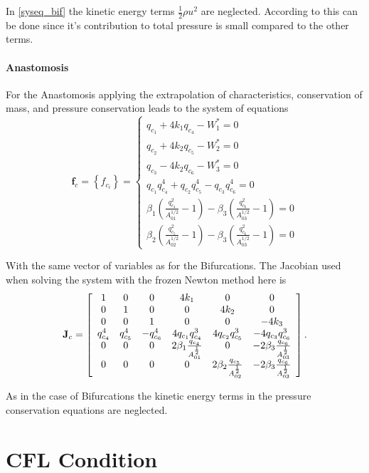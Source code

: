\documentclass[a4paper, oneside]{discothesis}
\begin{document}
In \ref{syseq_bif} the kinetic energy terms $\frac{1}{2} \rho u^2$ are neglected.
	According to \cite{Formaggia2003OnedimensionalMF} this can be done since it's contribution to total pressure is small compared to the other terms.
\paragraph{Anastomosis} \label{par:anastomosis}
For the Anastomosis applying the extrapolation of characteristics, conservation of mass, and pressure conservation leads to the system of equations
$$
\mathbf{f}_c=\left\{f_{c_i}\right\}=\left\{\begin{array}{l}
		q_{c_1}+4 k_1 q_{c_4}-W_1^*=0 \\
		q_{c_2}+4 k_2 q_{c_5}-W_2^*=0 \\
		q_{c_3}-4 k_2 q_{c_6}-W_3^*=0 \\
		q_{c_1} q_{c_4}^4+q_{c_2} q_{c_5}^4-q_{c_3} q_{c_6}^4=0 \\
		\beta_1\left(\frac{q_{c_4}^2}{A_{01}^{1 / 2}}-1\right)-\beta_3\left(\frac{q_{c_6}^2}{A_{03}^{1 / 2}}-1\right)=0 \\
		\beta_2\left(\frac{q_{c_5}^2}{A_{02}^{1 / 2}}-1\right)-\beta_3\left(\frac{q_{c_6}^2}{A_{03}^{1 / 2}}-1\right)=0
\end{array}\right.
$$

With the same vector of variables as for the Bifurcations.
The Jacobian used when solving the system with the frozen Newton method here is
$$\mathbf{J}_{c}=\left[\begin{array}{c c c c c c}
		1&0&0&4k_1&0&0\\
		0&1&0&0&4k_2&0\\
		0&0&1&0&0&-4k_3\\
		q_{c_4}^4 & q_{c_5}^4 & -q_{c_6}^4 & 4q_{c_1}q_{c_4}^3 & 4q_{c_2}q_{c_5}^3 & -4q_{c_3}q_{c_6}^3 \\
		0 & 0 & 0 & 2\beta_1\frac{q_{c_4}}{A_{01}^{\frac{1}{2}}} & 0 & -2\beta_3\frac{q_{c_6}}{A_{03}^{\frac{1}{2}}} \\
		0 & 0 & 0 & 0 & 2\beta_2\frac{q_{c_5}}{A_{02}^{\frac{1}{2}}} &  -2\beta_3\frac{q_{c_6}}{A_{03}^{\frac{1}{2}}} \\
	\end{array} 
\right].
$$

As in the case of Bifurcations the kinetic energy terms in the pressure conservation equations are neglected.

\section{CFL Condition} \label{sec:cfl}
\end{document}
